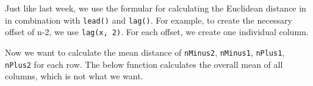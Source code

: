 \documentclass[]{book}
\newenvironment{Shaded}{\begin{snugshade}}{\end{snugshade}}
\newcommand{\KeywordTok}[1]{\textcolor[rgb]{0.13,0.29,0.53}{\textbf{#1}}}
\newcommand{\DataTypeTok}[1]{\textcolor[rgb]{0.13,0.29,0.53}{#1}}
\newcommand{\DecValTok}[1]{\textcolor[rgb]{0.00,0.00,0.81}{#1}}
\newcommand{\StringTok}[1]{\textcolor[rgb]{0.31,0.60,0.02}{#1}}
\newcommand{\CommentTok}[1]{\textcolor[rgb]{0.56,0.35,0.01}{\textit{#1}}}
\newcommand{\OperatorTok}[1]{\textcolor[rgb]{0.81,0.36,0.00}{\textbf{#1}}}
\newcommand{\NormalTok}[1]{#1}
\begin{document}
Just like last week, we use the formular for calculating the Euclidean
distance in in combination with \texttt{lead()} and \texttt{lag()}. For
example, to create the necessary offset of n-2, we use
\texttt{lag(x,\ 2)}. For each offset, we create one individual column.

\begin{Shaded}
\end{Shaded}

Now we want to calculate the mean distance of \texttt{nMinus2},
\texttt{nMinus1}, \texttt{nPlus1}, \texttt{nPlus2} for each row. The
below function calculates the overall mean of all columns, which is not
what we want.
\end{document}
